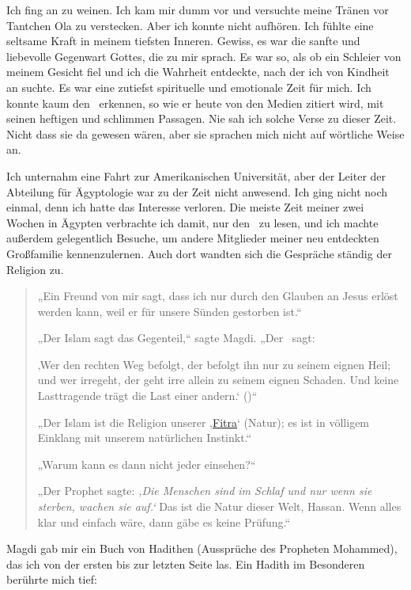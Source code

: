 \documentclass[12pt]{memoir}
\begin{document}
Ich fing an zu weinen.
Ich kam mir dumm vor und versuchte meine Tränen vor Tantchen Ola zu verstecken.
Aber ich konnte nicht aufhören.
Ich fühlte eine seltsame Kraft in meinem tiefsten Inneren.
Gewiss, es war die sanfte und liebevolle Gegenwart Gottes, die zu mir sprach.
Es war so, als ob ein Schleier von meinem Gesicht fiel
und ich die Wahrheit entdeckte, nach der ich von Kindheit an suchte.
Es war eine zutiefst spirituelle und emotionale Zeit für mich.
Ich konnte kaum den \Quran\ erkennen,
so wie er heute von den Medien zitiert wird,
mit seinen heftigen und schlimmen Passagen.
Nie sah ich solche Verse zu dieser Zeit.
Nicht dass sie da gewesen wären,
aber sie sprachen mich nicht auf wörtliche Weise an.

Ich unternahm eine Fahrt zur Amerikanischen Universität,
aber der Leiter der Abteilung für Ägyptologie war zu der Zeit nicht anwesend.
Ich ging nicht noch einmal, denn ich hatte das Interesse verloren.
Die meiste Zeit meiner zwei Wochen in Ägypten verbrachte ich damit,
nur den \Quran\ zu lesen, und ich machte außerdem gelegentlich Besuche,
um andere Mitglieder meiner neu entdeckten Großfamilie kennenzulernen.
Auch dort wandten sich die Gespräche ständig der Religion zu.

\begin{quote}
„Ein Freund von mir sagt,
dass ich nur durch den Glauben an Jesus erlöst werden kann,
weil er für unsere Sünden gestorben ist.“

„Der Islam sagt das Gegenteil,“ sagte Magdi. „Der \Quran\ sagt:

‚Wer den rechten Weg befolgt, der befolgt ihn nur zu seinem eignen Heil;
und wer irregeht, der geht irre allein zu seinem eignen Schaden.
Und keine Lasttragende trägt die Last einer andern.‘
()“

„Der Islam ist die Religion unserer
‚\href{http://de.wikipedia.org/wiki/Fitra}{Fitra}‘ (Natur);
es ist in völligem Einklang mit unserem natürlichen Instinkt.“

„Warum kann es dann nicht jeder einsehen?“

„Der Prophet sagte:
\emph{‚Die Menschen sind im Schlaf und nur wenn sie sterben, wachen sie auf.‘}
Das ist die Natur dieser Welt, Hassan.
Wenn alles klar und einfach wäre, dann gäbe es keine Prüfung.“
\end{quote}

Magdi gab mir ein Buch von Hadithen (Aussprüche des Propheten Mohammed),
das ich von der ersten bis zur letzten Seite las.
Ein Hadith im Besonderen berührte mich tief:
\end{document}
